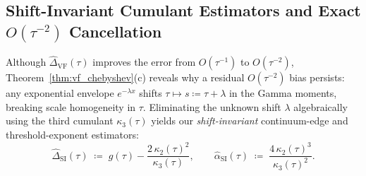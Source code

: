 \documentclass[11pt,a4paper]{article}
\theoremstyle{definition}
\begin{document}
\subsection{Shift-Invariant Cumulant Estimators and Exact \texorpdfstring{$O(\tau^{-2})$}{O(tau\textasciicircum(-2))} Cancellation}

Although $\widehat{\Delta}_{\mathrm{VF}}(\tau)$ improves the error from $O(\tau^{-1})$ to $O(\tau^{-2})$, Theorem~\ref{thm:vf_chebyshev}(c) reveals why a residual $O(\tau^{-2})$ bias persists: any exponential envelope $e^{-\lambda x}$ shifts $\tau \mapsto s \coloneqq \tau + \lambda$ in the Gamma moments, breaking scale homogeneity in $\tau$. Eliminating the unknown shift $\lambda$ algebraically using the third cumulant $\kappa_3(\tau)$ yields our \emph{shift-invariant} continuum-edge and threshold-exponent estimators:
\begin{equation}
  \widehat{\Delta}_{\mathrm{SI}}(\tau) \;\coloneqq\; g(\tau) - \frac{2\,\kappa_2(\tau)^2}{\kappa_3(\tau)}, \qquad
  \widehat{\alpha}_{\mathrm{SI}}(\tau) \;\coloneqq\; \frac{4\,\kappa_2(\tau)^3}{\kappa_3(\tau)^2}.
  \label{eq:si_def}
\end{equation}
\end{document}
